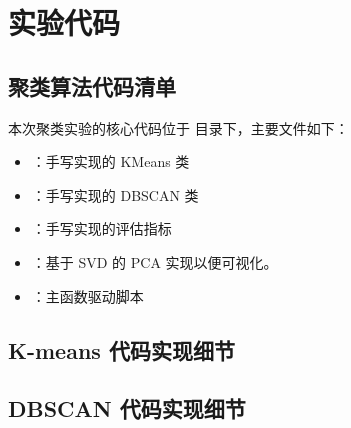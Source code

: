 \chapter{实验代码}


\section{聚类算法代码清单}
本次聚类实验的核心代码位于  目录下，主要文件如下：
\begin{itemize}
	\item {}：手写实现的 KMeans 类
	\item {}：手写实现的 DBSCAN 类
	\item {}：手写实现的评估指标
	\item {}：基于 SVD 的 PCA 实现以便可视化。
	\item {}：主函数驱动脚本
\end{itemize}

\section{K-means 代码实现细节}


\section{DBSCAN 代码实现细节}
